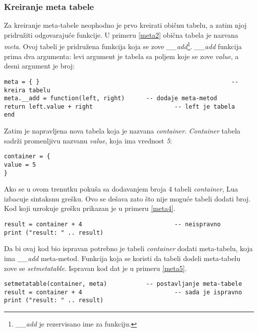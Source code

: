 \documentclass[a4paper]{article}
\begin{document}
\subsubsection*{Kreiranje meta tabele}
Za kreiranje meta-tabele neophodno je prvo kreirati običnu tabelu, a zatim njoj pridružiti odgovarajuće funkcije. U primeru \ref{meta2} obična tabela je nazvana \textit{meta}. Ovoj tabeli je pridružena funkcija koja se zove \textit{\_\_add}\footnote{\textit{\_\_add} je rezervisano ime za funkciju.}. \textit{\_\_add} funkcija prima dva argumenta: levi argument je tabela sa poljem koje se zove \textit{value}, a desni argument je broj:
\begin{lstlisting}[caption={Kreiranje meta-tabele i dodavanje meta-metoda \cite{bookProgInLua}},frame=single, label=meta2]
meta = { } 														-- kreira tabelu
meta.__add = function(left, right)		-- dodaje meta-metod
return left.value + right 						-- left je tabela
end
\end{lstlisting}
Zatim je napravljena nova tabela koja je nazvana \textit{container}. \textit{Container} tabela sadrži promenljivu nazvanu \textit{value}, koja ima vrednost \textit{5}:
\begin{lstlisting}[caption={Tabela \textit{container} \cite{bookProgInLua}},frame=single, label=meta3]
container = {
value = 5
}
\end{lstlisting}
Ako se u ovom trenutku pokuša sa dodavanjem broja 4 tabeli \textit{container}, Lua izbacuje sintaksnu grešku. Ovo se dešava zato što nije moguće tabeli dodati broj. Kod koji uzrokuje grešku prikazan je u primeru \ref{meta4}.
\begin{lstlisting}[caption={Neispravno sabiranje tabele i broja \cite{bookProgInLua}},frame=single, label=meta4]
result = container + 4 							-- neispravno
print ("result: " .. result)
\end{lstlisting}
Da bi ovaj kod bio ispravan potrebno je tabeli \textit{container} dodati meta-tabelu, koja ima \textit{\_\_add} meta-metod. Funkcija koja se koristi da tabeli dodeli meta-tabelu zove se \textit{setmetatable}. Ispravan kod dat je u primeru \ref{meta5}.
\begin{lstlisting}[caption={Ispravno sabiranje tabele i broja \cite{bookProgInLua}},frame=single, label=meta5]
setmetatable(container, meta) 			-- postavljanje meta-tabele
result = container + 4 							-- sada je ispravno
print ("result: " .. result)
\end{lstlisting}


\end{document}
